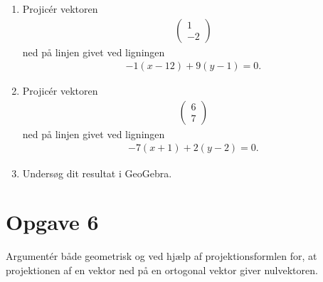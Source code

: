 \begin{enumerate}[label=\roman*)]
	\item Projicér vektoren 
	\begin{align*}
		\begin{pmatrix}
			1 \\ -2
		\end{pmatrix}
	\end{align*}
	ned på linjen givet ved ligningen
	\begin{align*}
		-1(x-12) + 9(y-1) = 0.
	\end{align*}
	\item Projicér vektoren 
	\begin{align*}
		\begin{pmatrix}
			6 \\  7
		\end{pmatrix}
	\end{align*}
	ned på linjen givet ved ligningen
	\begin{align*}
		-7(x+1) + 2(y-2) = 0.
	\end{align*}
	\item Undersøg dit resultat i GeoGebra.
\end{enumerate}

\section*{Opgave 6}
Argumentér både geometrisk og ved hjælp af projektionsformlen for, at projektionen af en vektor ned på en ortogonal vektor giver nulvektoren. 

